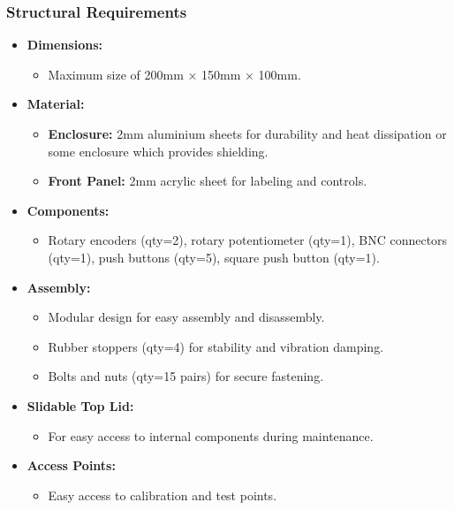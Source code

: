 \documentclass[a4paper,12pt]{article}
\begin{document}
\subsubsection{Structural Requirements}
\begin{itemize}
    \item \textbf{Dimensions:}
    \begin{itemize}
        \item Maximum size of 200mm × 150mm × 100mm.
    \end{itemize}
    \item \textbf{Material:}
    \begin{itemize}
        \item \textbf{Enclosure:} 2mm aluminium sheets for durability and heat dissipation or some enclosure which provides shielding.
        \item \textbf{Front Panel:} 2mm acrylic sheet for labeling and controls.
    \end{itemize}
    \item \textbf{Components:}
    \begin{itemize}
        \item Rotary encoders (qty=2), rotary potentiometer (qty=1), BNC connectors (qty=1), push buttons (qty=5), square push button (qty=1).
    \end{itemize}
    \item \textbf{Assembly:}
    \begin{itemize}
        \item Modular design for easy assembly and disassembly.
        \item Rubber stoppers (qty=4) for stability and vibration damping.
        \item Bolts and nuts (qty=15 pairs) for secure fastening.
    \end{itemize}
    \item \textbf{Slidable Top Lid:}
    \begin{itemize}
        \item For easy access to internal components during maintenance.
    \end{itemize}
    \item \textbf{Access Points:}
    \begin{itemize}
        \item Easy access to calibration and test points.
    \end{itemize}
\end{itemize}
\end{document}
